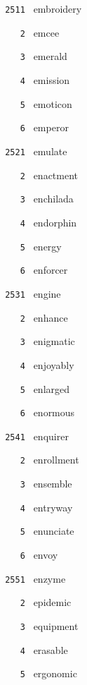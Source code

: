 \documentclass[11pt]{article}
\begin{document}
\begin{multicols}{6}
\noindent \texttt{ 2511 } embroidery  \par
\noindent \texttt{ \ \ \ 2 } emcee  \par
\noindent \texttt{ \ \ \ 3 } emerald  \par
\noindent \texttt{ \ \ \ 4 } emission  \par
\noindent \texttt{ \ \ \ 5 } emoticon  \par
\noindent \texttt{ \ \ \ 6 } emperor  \par
\vspace{3mm}
\noindent \texttt{ 2521 } emulate  \par
\noindent \texttt{ \ \ \ 2 } enactment  \par
\noindent \texttt{ \ \ \ 3 } enchilada  \par
\noindent \texttt{ \ \ \ 4 } endorphin  \par
\noindent \texttt{ \ \ \ 5 } energy  \par
\noindent \texttt{ \ \ \ 6 } enforcer  \par
\vspace{3mm}
\noindent \texttt{ 2531 } engine  \par
\noindent \texttt{ \ \ \ 2 } enhance  \par
\noindent \texttt{ \ \ \ 3 } enigmatic  \par
\noindent \texttt{ \ \ \ 4 } enjoyably  \par
\noindent \texttt{ \ \ \ 5 } enlarged  \par
\noindent \texttt{ \ \ \ 6 } enormous  \par
\vspace{3mm}
\noindent \texttt{ 2541 } enquirer  \par
\noindent \texttt{ \ \ \ 2 } enrollment  \par
\noindent \texttt{ \ \ \ 3 } ensemble  \par
\noindent \texttt{ \ \ \ 4 } entryway  \par
\noindent \texttt{ \ \ \ 5 } enunciate  \par
\noindent \texttt{ \ \ \ 6 } envoy  \par
\vspace{3mm}
\noindent \texttt{ 2551 } enzyme  \par
\noindent \texttt{ \ \ \ 2 } epidemic  \par
\noindent \texttt{ \ \ \ 3 } equipment  \par
\noindent \texttt{ \ \ \ 4 } erasable  \par
\noindent \texttt{ \ \ \ 5 } ergonomic  \par

\end{multicols}
\end{document}
